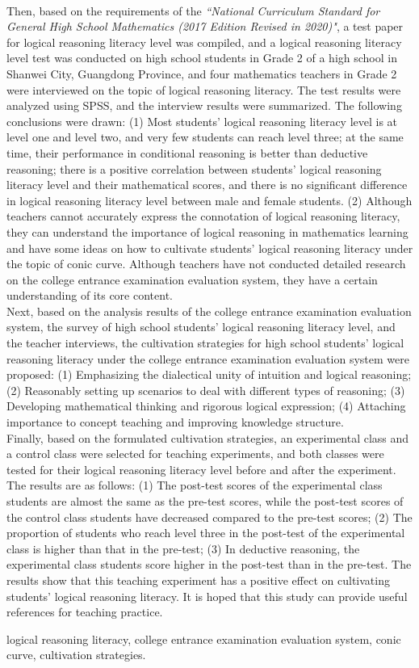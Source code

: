 \begin{eabstract}
\\
\indent
Then, based on the requirements of the \textsl{``National Curriculum Standard for General High School Mathematics (2017 Edition Revised in 2020)"}, a test paper for logical reasoning literacy level was compiled, and a logical reasoning literacy level test was conducted on high school students in Grade 2 of a high school in Shanwei City, Guangdong Province, and four mathematics teachers in Grade 2 were interviewed on the topic of logical reasoning literacy. The test results were analyzed using SPSS, and the interview results were summarized. The following conclusions were drawn: (1) Most students' logical reasoning literacy level is at level one and level two, and very few students can reach level three; at the same time, their performance in conditional reasoning is better than deductive reasoning; there is a positive correlation between students' logical reasoning literacy level and their mathematical scores, and there is no significant difference in logical reasoning literacy level between male and female students. (2) Although teachers cannot accurately express the connotation of logical reasoning literacy, they can understand the importance of logical reasoning in mathematics learning and have some ideas on how to cultivate students' logical reasoning literacy under the topic of conic curve. Although teachers have not conducted detailed research on the college entrance examination evaluation system, they have a certain understanding of its core content. 
\\
\indent
Next, based on the analysis results of the college entrance examination evaluation system, the survey of high school students' logical reasoning literacy level, and the teacher interviews, the cultivation strategies for high school students' logical reasoning literacy under the college entrance examination evaluation system were proposed: (1) Emphasizing the dialectical unity of intuition and logical reasoning; (2) Reasonably setting up scenarios to deal with different types of reasoning; (3) Developing mathematical thinking and rigorous logical expression; (4) Attaching importance to concept teaching and improving knowledge structure. 
\\
\indent
Finally, based on the formulated cultivation strategies, an experimental class and a control class were selected for teaching experiments, and both classes were tested for their logical reasoning literacy level before and after the experiment. The results are as follows: (1) The post-test scores of the experimental class students are almost the same as the pre-test scores, while the post-test scores of the control class students have decreased compared to the pre-test scores; (2) The proportion of students who reach level three in the post-test of the experimental class is higher than that in the pre-test; (3) In deductive reasoning, the experimental class students score higher in the post-test than in the pre-test. The results show that this teaching experiment has a positive effect on cultivating students' logical reasoning literacy. It is hoped that this study can provide useful references for teaching practice. 
\end{eabstract}

\begin{ekeywords}
 logical reasoning literacy, college entrance examination evaluation system, conic curve, cultivation strategies.
\end{ekeywords} 
\makeabstract 